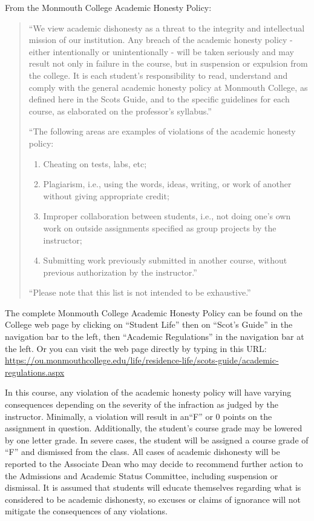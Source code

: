 \documentclass[10pt]{article}
\begin{document}
From the Monmouth College Academic Honesty Policy:
\begin{quote}
  ``We view academic dishonesty as a threat to the integrity and intellectual mission of our institution. Any breach of the academic honesty policy - either intentionally or unintentionally - will be taken seriously and may result not only in failure in the course, but in suspension or expulsion from the college. It is each student's responsibility to read, understand and comply with the general academic honesty policy at Monmouth College, as defined here in the Scots Guide, and to the specific guidelines for each course, as elaborated on the professor's syllabus.''

  ``The following areas are examples of violations of the academic honesty policy:
  \begin{enumerate}
  \item Cheating on tests, labs, etc;
  \item Plagiarism, i.e., using the words, ideas, writing, or work of another without giving appropriate credit;
  \item Improper collaboration between students, i.e., not doing one’s own work on outside assignments specified as group projects by the instructor;
  \item Submitting work previously submitted in another course, without previous authorization by the instructor.''
  \end{enumerate}

  ``Please note that this list is not intended to be exhaustive.''
\end{quote}

The complete Monmouth College Academic Honesty Policy can be found on the College web page by clicking on ``Student Life'' then on ``Scot’s Guide'' in the navigation bar to the left, then ``Academic Regulations'' in the navigation bar at the left.  Or you can visit the web page directly by typing in this URL: \url{https://ou.monmouthcollege.edu/life/residence-life/scots-guide/academic-regulations.aspx}

In this course, any violation of the academic honesty policy will have varying consequences depending on the severity of the infraction as judged by the instructor. Minimally, a violation will result in an``F'' or 0 points on the assignment in question. Additionally, the student’s course grade may be lowered by one letter grade. In severe cases, the student will be assigned a course grade of ``F'' and dismissed from the class. All cases of academic dishonesty will be reported to the Associate Dean who may decide to recommend further action to the Admissions and Academic Status Committee, including suspension or dismissal. It is assumed that students will educate themselves regarding what is considered to be academic dishonesty, so excuses or claims of ignorance will not mitigate the consequences of any violations.
\end{document}
